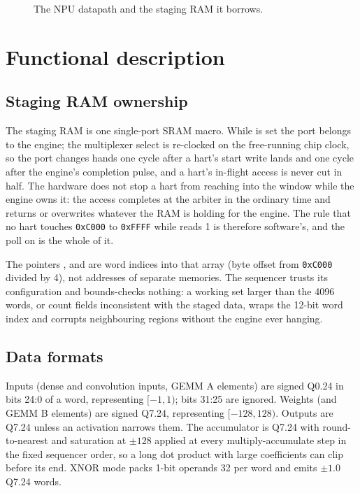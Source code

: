 \begin{figure}[htpb]
	\centering
	
	\caption{The NPU datapath and the staging RAM it borrows.}
	\label{fig:npu-datapath}
\end{figure}


\section{Functional description}

\subsection{Staging RAM ownership}

The staging RAM is one single-port SRAM macro. While  is set the port belongs to the engine; the multiplexer select is  re-clocked on the free-running chip clock, so the port changes hands one cycle after a hart's start write lands and one cycle after the engine's completion pulse, and a hart's in-flight access is never cut in half. The hardware does not stop a hart from reaching into the window while the engine owns it: the access completes at the arbiter in the ordinary time and returns or overwrites whatever the RAM is holding for the engine. The rule that no hart touches \texttt{0xC000} to \texttt{0xFFFF} while  reads 1 is therefore software's, and the poll on  is the whole of it.

The pointers ,  and  are word indices into that array (byte offset from \texttt{0xC000} divided by 4), not addresses of separate memories. The sequencer trusts its configuration and bounds-checks nothing: a working set larger than the 4096 words, or count fields inconsistent with the staged data, wraps the 12-bit word index and corrupts neighbouring regions without the engine ever hanging.

\subsection{Data formats}

Inputs (dense and convolution inputs, GEMM A elements) are signed Q0.24 in bits 24:0 of a word, representing $[-1, 1)$; bits 31:25 are ignored. Weights (and GEMM B elements) are signed Q7.24, representing $[-128, 128)$. Outputs are Q7.24 unless an activation narrows them. The accumulator is Q7.24 with round-to-nearest and saturation at $\pm 128$ applied at every multiply-accumulate step in the fixed sequencer order, so a long dot product with large coefficients can clip before its end. XNOR mode packs 1-bit operands 32 per word and emits $\pm 1.0$ Q7.24 words.

